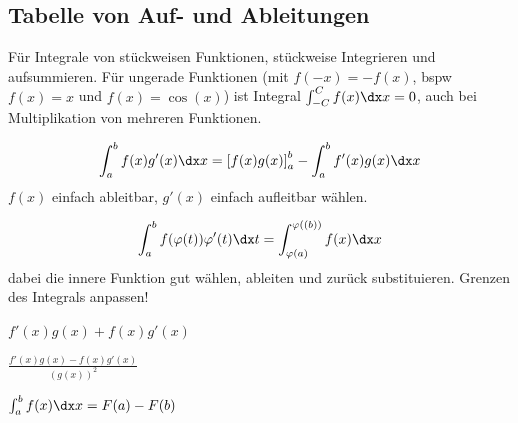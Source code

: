 \newpage
\subsection{Tabelle von Auf- und Ableitungen}
Für Integrale von stückweisen Funktionen, stückweise Integrieren und aufsummieren.
Für ungerade Funktionen (mit $f(-x) = -f(x)$, bspw $f(x) = x$ und $f(x) = \cos(x)$) ist Integral $\int_{-C}^C f(x) \dx x = 0$, auch bei Multiplikation von mehreren Funktionen.

\[
    \int_{a}^{b} f(x) g'(x) \dx x = \left[f(x) g(x)\right]^b_a - \int_{a}^{b} f'(x) g(x) \dx x
\]
$f(x)$ einfach ableitbar, $g'(x)$ einfach aufleitbar wählen.

\[
    \int_{a}^{b} f(\varphi(t)) \varphi'(t) \dx t = \int_{\varphi(a)}^{\varphi((b))} f(x) \dx x
\]
dabei die innere Funktion gut wählen, ableiten und zurück substituieren. Grenzen des Integrals anpassen!

 $f'(x)g(x) + f(x)g'(x)$

 $\displaystyle \frac{f'(x)g(x) - f(x)g'(x)}{(g(x))^2}$

 $\int_{a}^{b} f(x) \dx x = F(a) - F(b)$



